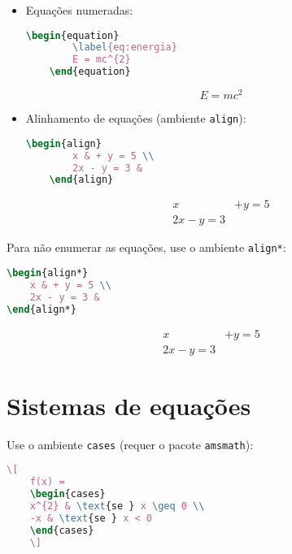 \begin{itemize}
    \item Equações numeradas:
    \begin{lstlisting}[language=tex, caption=Equação numerada]
    \begin{equation}
        \label{eq:energia}
        E = mc^{2}
    \end{equation}
    \end{lstlisting}
    \begin{equation}
        \label{eq:energia}
        E = mc^{2}
    \end{equation}

    \item Alinhamento de equações (ambiente \verb|align|):
    \begin{lstlisting}[language=tex, caption=Equações alinhadas]
    \begin{align}
        x & + y = 5 \\
        2x - y = 3 &
    \end{align}
    \end{lstlisting}
    \begin{align}
        x & + y = 5 \\
        2x - y = 3 &
    \end{align}
\end{itemize}

Para não enumerar as equações, use o ambiente \verb|align*|:

\begin{lstlisting}[language=tex, caption=Equações alinhadas e não enumeradas]
\begin{align*}
    x & + y = 5 \\
    2x - y = 3 &
\end{align*}
\end{lstlisting}
\begin{align*}
    x & + y = 5 \\
    2x - y = 3 &
\end{align*}

\section{Sistemas de equações}

Use o ambiente \verb|cases| (requer o pacote \verb|amsmath|):

\begin{lstlisting}[language=tex, caption=Sistema de equações]
    \[
    f(x) = 
    \begin{cases}
    x^{2} & \text{se } x \geq 0 \\
    -x & \text{se } x < 0
    \end{cases}
    \]
\end{lstlisting}

